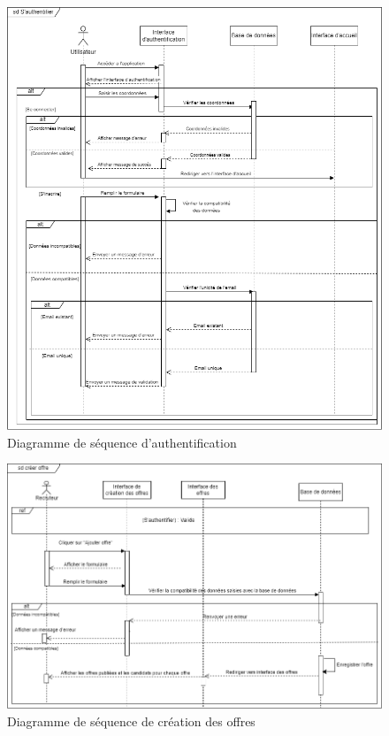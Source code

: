 \begin{figure}[htbp]
   \centering
   \includegraphics[scale=0.8]{Images/auth.png} %
   \caption{Diagramme de séquence d’authentification}
   \label{fig:seq1}
\end{figure}

\begin{figure}[htbp]
   \centering
   \includegraphics[scale=0.8]{Images/creerOffre.png} %
   \caption{Diagramme de séquence de création des offres}
   \label{fig:seq2}
\end{figure}

